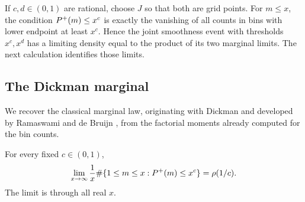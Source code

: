 If $c,d\in(0,1)$ are rational, choose $J$ so that both are grid
points.  For $m\le x$, the condition $P^+(m)\le x^c$ is
exactly the vanishing of all counts in bins with lower endpoint at
least $x^c$.  Hence the joint smoothness event with thresholds
$x^c,x^d$ has a limiting density equal to the product of its two
marginal limits.  The next calculation identifies those limits.

\subsection{The Dickman marginal}

We recover the classical marginal law, originating with Dickman and
developed by Ramaswami and de Bruijn
\cite{Dickman1930,Ramaswami1949,deBruijn1951}, from the factorial moments
already computed for the bin counts.

\begin{lemma}
\label{lem:distribution-dickman}
For every fixed $c\in(0,1)$,
\begin{equation}
 \lim_{x\to\infty}\frac1x
   \#\{1\le m\le x:P^+(m)\le x^c\}=\rho(1/c).
 \label{eq:distribution-dickman}
\end{equation}
The limit is through all real $x$.
\end{lemma}

